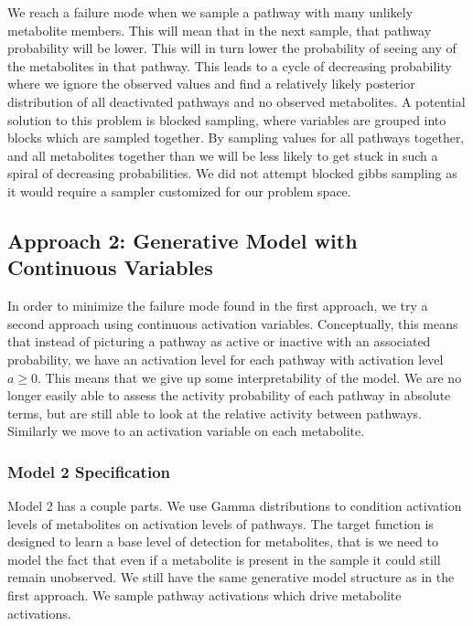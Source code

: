 \documentclass[11pt]{article}
\begin{document}
We reach a failure mode when we sample a pathway with many unlikely metabolite members. This will mean that in the next sample, that pathway probability will be lower. This will in turn lower the probability of seeing any of the metabolites in that pathway. This leads to a cycle of decreasing probability where we ignore the observed values and find a relatively likely posterior distribution of all deactivated pathways and no observed metabolites. A potential solution to this problem is blocked sampling, where variables are grouped into blocks which are sampled together. By sampling values for all pathways together, and all metabolites together than we will be less likely to get stuck in such a spiral of decreasing probabilities. We did not attempt blocked gibbs sampling as it would require a sampler customized for our problem space. 

\subsection{Approach 2: Generative Model with Continuous Variables}

In order to minimize the failure mode found in the first approach, we try a second approach using continuous activation variables. Conceptually, this means that instead of picturing a pathway as active or inactive with an associated probability, we have an activation level for each pathway with activation level $a \ge 0$. This means that we give up some interpretability of the model. We are no longer easily able to assess the activity probability of each pathway in absolute terms, but are still able to look at the relative activity between pathways. Similarly we move to an activation variable on each metabolite. 

\subsubsection{Model 2 Specification}
Model 2 has a couple parts. We use Gamma distributions to condition activation levels of metabolites on activation levels of pathways. The target function is designed to learn a base level of detection for metabolites, that is we need to model the fact that even if a metabolite is present in the sample it could still remain unobserved. We still have the same generative model structure as in the first approach. We sample pathway activations which drive metabolite activations.
\end{document}
